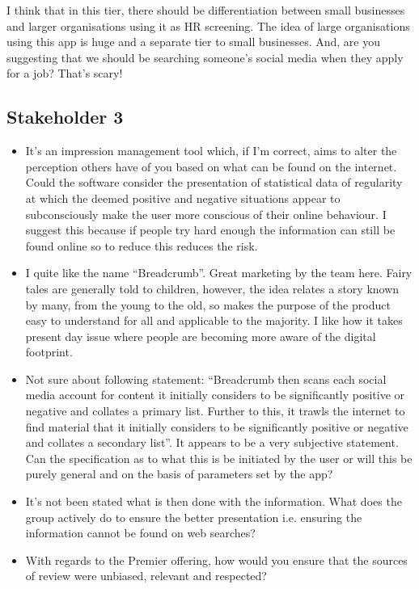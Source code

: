       I think that in this tier, there should be differentiation between small businesses and larger organisations using it as HR screening. The idea of large organisations using this app is huge and a separate tier to small businesses. And, are you suggesting that we should be searching someone's social media when they apply for a job? That's scary!

  \subsection{Stakeholder 3}

    \begin{itemize}
      \item It's an impression management tool which, if I'm correct, aims to alter the perception others have of you based on what can be found on the internet. Could the software consider the presentation of statistical data of regularity at which the deemed positive and negative situations appear to subconsciously make the user more conscious of their online behaviour. I suggest this because if people try hard enough the information can still be found online so to reduce this reduces the risk.
      \item I quite like the name “Breadcrumb”. Great marketing by the team here. Fairy tales are generally told to children, however, the idea relates a story known by many, from the young to the old, so makes the purpose of the product easy to understand for all and applicable to the majority. I like how it takes present day issue where people are becoming more aware of the digital footprint.
      \item Not sure about following statement: “Breadcrumb then scans each social media account for content it initially considers to be significantly positive or negative and collates a primary list. Further to this, it trawls the internet to find material that it initially considers to be significantly positive or negative and collates a secondary list”. It appears to be a very subjective statement. Can the specification as to what this is be initiated by the user or will this be purely general and on the basis of parameters set by the app?
      \item It's not been stated what is then done with the information. What does the group actively do to ensure the better presentation i.e. ensuring the information cannot be found on web searches?
      \item With regards to the Premier offering, how would you ensure that the sources of review were unbiased, relevant and respected?
    \end{itemize}

